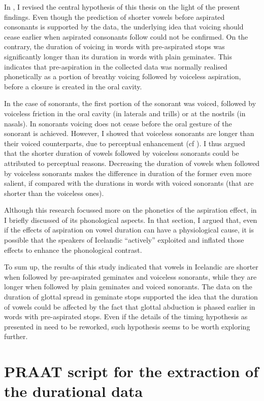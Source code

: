 \documentclass[11pt,a4paper,oneside,openany]{memoir}\usepackage[]{graphicx}\usepackage[]{color}
\begin{document}
In , I revised the central hypothesis of this thesis on the light of the present findings.
Even though the prediction of shorter vowels before aspirated consonants is supported by the data, the underlying idea that voicing should cease earlier when aspirated consonants follow could not be confirmed.
On the contrary, the duration of voicing in words with pre-aspirated stops was significantly longer than its duration in words with plain geminates.
This indicates that pre-aspiration in the collected data was normally realised phonetically as a portion of breathy voicing followed by voiceless aspiration, before a closure is created in the oral cavity.

In the case of sonorants, the first portion of the sonorant was voiced, followed by voiceless friction in the oral cavity (in laterals and trills) or at the nostrils (in nasals).
In sonorants voicing does not cease before the oral gesture of the sonorant is achieved.
However, I showed that voiceless sonorants are longer than their voiced counterparts, due to perceptual enhancement (cf ).
I thus argued that the shorter duration of vowels followed by voiceless sonorants could be attributed to perceptual reasons.
Decreasing the duration of vowels when followed by voiceless sonorants makes the difference in duration of the former even more salient, if compared with the durations in words with voiced sonorants (that are shorter than the voiceless ones).

Although this research focussed more on the phonetics of the aspiration effect, in  I briefly discussed of its phonological aspects.
In that section, I argued that, even if the effects of aspiration on vowel duration can have a physiological cause, it is possible that the speakers of Icelandic ``actively'' exploited and inflated those effects to enhance the phonological contrast.

To sum up, the results of this study indicated that vowels in Icelandic are shorter when followed by pre-aspirated geminates and voiceless sonorants, while they are longer when followed by plain geminates and voiced sonorants.
The data on the duration of glottal spread in geminate stops supported the idea that the duration of vowels could be affected by the fact that glottal abduction is phased earlier in words with pre-aspirated stops.
Even if the details of the timing hypothesis as presented in  need to be reworked, such hypothesis seems to be worth exploring further.
 












\appendix





\chapter{PRAAT script for the extraction of the durational data}
\label{a:getmeasure}









\end{document}

